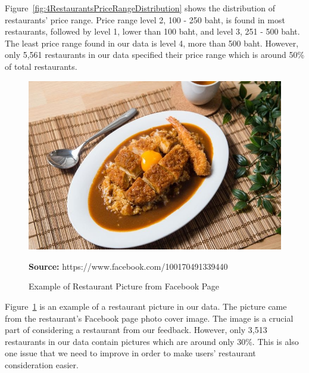 \documentclass[12pt,oneside,openright,a4paper]{cpe-english-project}
\newcommand*{\captionsource}[2]{%
  \caption[{#1}]{#1}\vspace{-8pt}
  \textbf{Source:} #2}
\begin{document}
Figure~\ref{fig:4RestaurantsPriceRangeDistribution} shows the distribution of restaurants' price range. Price range level 2, 100 - 250 baht, is found in most restaurants, followed by level 1, lower than 100 baht, and level 3, 251 - 500 baht. The least price range found in our data is level 4, more than 500 baht. However, only 5,561 restaurants in our data specified their price range which is around 50\% of total restaurants.

\begin{figure}[H]\centering
\includegraphics[width=350pt]{./images/4ExampleofRestaurantPicturefromFacebookPage.jpeg}
\captionsource{Example of Restaurant Picture from Facebook Page}{https://www.facebook.com/100170491339440}\label{fig:4ExampleofRestaurantPicturefromFacebookPage}
\end{figure}\vspace{-24pt}
\vspace{1em}

Figure~\ref{fig:4ExampleofRestaurantPicturefromFacebookPage} is an example of a restaurant picture in our data. The picture came from the restaurant's Facebook page photo cover image. The image is a crucial part of considering a restaurant from our feedback. However, only 3,513 restaurants in our data contain pictures which are around only 30\%. This is also one issue that we need to improve in order to make users’ restaurant consideration easier.
\end{document}
